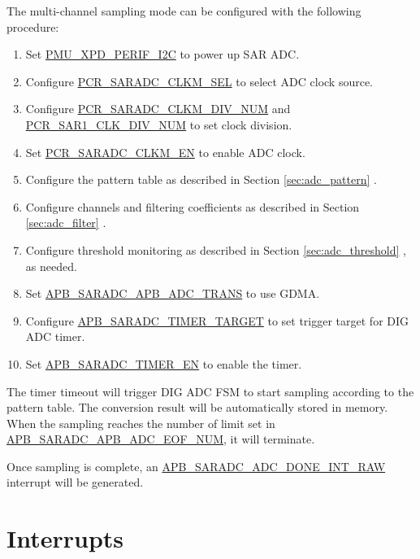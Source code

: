 \documentclass[main\_\_EN.tex]{subfiles}
\begin{document}
The multi-channel sampling mode can be configured with the following procedure:

\begin{enumerate}
    \item Set \hyperref[fielddesc:PMUXPDPERIFI2C]{PMU\_XPD\_PERIF\_I2C} to power up SAR ADC.
    \item Configure \hyperref[fielddesc:PCRSARADCCLKMSEL]{PCR\_SARADC\_CLKM\_SEL} to select ADC clock source.
    \item Configure \hyperref[fielddesc:PCRSARADCCLKMDIVNUM]{PCR\_SARADC\_CLKM\_DIV\_NUM} and \hyperref[fielddesc:PCRSAR1CLKDIVNUM]{PCR\_SAR1\_CLK\_DIV\_NUM} to set clock division.
    \item Set \hyperref[fielddesc:PCRSARADCCLKMEN]{PCR\_SARADC\_CLKM\_EN} to enable ADC clock.
    \item Configure the pattern table as described in Section \ref{sec:adc_pattern} \textit{}.
    \item Configure channels and filtering coefficients as described in Section \ref{sec:adc_filter} \textit{}.
    \item Configure threshold monitoring as described in Section \ref{sec:adc_threshold} \textit{}, as needed.
    \item Set \hyperref[fielddesc:APBSARADCAPBADCTRANS]{APB\_SARADC\_APB\_ADC\_TRANS} to use GDMA.
    \item Configure \hyperref[fielddesc:APBSARADCTIMERTARGET]{APB\_SARADC\_TIMER\_TARGET} to set trigger target for DIG ADC timer.
    \item Set \hyperref[fielddesc:APBSARADCTIMEREN]{APB\_SARADC\_TIMER\_EN} to enable the timer.
\end{enumerate}    

The timer timeout will trigger DIG ADC FSM to start sampling according to the pattern table. The conversion result will be automatically stored in memory. When the sampling reaches the number of limit set in  \hyperref[fielddesc:APBSARADCAPBADCEOFNUM]{APB\_SARADC\_APB\_ADC\_EOF\_NUM}, it will terminate.

Once sampling is complete, an \hyperref[fielddesc:APBSARADCDONEINTRAW]{APB\_SARADC\_ADC\_DONE\_INT\_RAW} interrupt will be generated.

\section{Interrupts}
\end{document}
